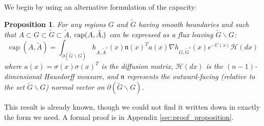 \documentclass[12pt, nofootinbib,english, amsmath, amssymb, aps, priprint, graphicx,floatfix,draft]{revtex4-1}
\newtheorem{proposition}{Proposition}
\theoremstyle{plain}
\theoremstyle{definition}
\theoremstyle{plain}
\newcommand{\normal}{{\mathfrak{n}}}
\newcommand{\capac}[2]{\ensuremath{\operatorname{cap}}(#1,#2)}
\newcommand{\hausdorffmeasure}{\mathscr{H}(dx)}
\newcommand{\tA}{{\tilde A}}
\begin{document}
We begin by using an alternative formulation of the capacity:

\begin{proposition}
\label{prop:flux}
For any regions $G$ and $\tilde{G}$ having smooth boundaries and such that $A\subset G \subset \tilde G \subset \tilde A$, $\capac{A,\tA}$ can be expressed as a flux leaving $\tilde G \backslash G$:
\begin{equation}
\label{eqn:GIntegral}
\ensuremath{\operatorname{cap}} (A, \tilde{A}) = \int_{\partial (\tilde G \backslash G)}  h_{A, \tilde{A}^c} (x)   \normal(x)^T a (x) \nabla h_{G, \tilde{G}^c} (x)e^{- U (x)} \hausdorffmeasure
\end{equation}
where $a(x)=\sigma(x)\sigma(x)^T$ is the diffusion matrix, $\hausdorffmeasure$ is the $(n-1)$-dimensional Hausdorff measure, and $\normal$ represents the outward-facing (relative to the set $\tilde G \backslash G$) normal vector on $\partial (\tilde G \backslash G)$.
\end{proposition}
\noindent This result is already known, though we could not find it written down in exactly the form we need.  A formal proof is in Appendix \ref{sec:proof_proposition}.
\end{document}
